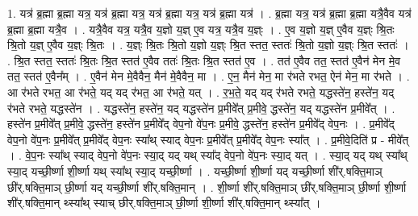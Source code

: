 \documentclass[17pt]{extarticle}
\begin{document}
1. यत्र॑ ब्र॒ह्मा ब्र॒ह्मा यत्र॒ यत्र॑ ब्र॒ह्मा यत्र॒ यत्र॑ ब्र॒ह्मा यत्र॒ यत्र॑ ब्र॒ह्मा यत्र॑ । . ब्र॒ह्मा यत्र॒ यत्र॑ ब्र॒ह्मा ब्र॒ह्मा यत्रै॒वैव यत्र॑ ब्र॒ह्मा ब्र॒ह्मा यत्रै॒व । . यत्रै॒वैव यत्र॒ यत्रै॒व य॒ज्ञो य॒ज्ञ् ए॒व यत्र॒ यत्रै॒व य॒ज्ञ्ः । . ए॒व य॒ज्ञो य॒ज्ञ् ए॒वैव य॒ज्ञ्ः श्रि॒तः श्रि॒तो य॒ज्ञ् ए॒वैव य॒ज्ञ्ः श्रि॒तः । . य॒ज्ञ्ः श्रि॒तः श्रि॒तो य॒ज्ञो य॒ज्ञ्ः श्रि॒त स्तत॒ स्ततः॑ श्रि॒तो य॒ज्ञो य॒ज्ञ्ः श्रि॒त स्ततः॑ । . श्रि॒त स्तत॒ स्ततः॑ श्रि॒तः श्रि॒त स्तत॑ ए॒वैव ततः॑ श्रि॒तः श्रि॒त स्तत॑ ए॒व । . तत॑ ए॒वैव तत॒ स्तत॑ ए॒वैन॑ मेन मे॒व तत॒ स्तत॑ ए॒वैन᳚म् । . ए॒वैन॑ मेन मे॒वैवैन॒ मैन॑ मे॒वैवैन॒ मा । . ए॒न॒ मैन॑ मेन॒ मा र॑भते रभत॒ ऐन॑ मेन॒ मा र॑भते । . आ र॑भते रभत॒ आ र॑भते॒ यद् यद् र॑भत॒ आ र॑भते॒ यत् । . र॒भ॒ते॒ यद् यद् र॑भते रभते॒ यद्धस्ते॑न॒ हस्ते॑न॒ यद् र॑भते रभते॒ यद्धस्ते॑न । . यद्धस्ते॑न॒ हस्ते॑न॒ यद् यद्धस्ते॑न प्र॒मीवे᳚त् प्र॒मीवे॒ द्धस्ते॑न॒ यद् यद्धस्ते॑न प्र॒मीवे᳚त् । . हस्ते॑न प्र॒मीवे᳚त् प्र॒मीवे॒ द्धस्ते॑न॒ हस्ते॑न प्र॒मीवे᳚द् वेप॒नो वे॑प॒नः प्र॒मीवे॒ द्धस्ते॑न॒ हस्ते॑न प्र॒मीवे᳚द् वेप॒नः । . प्र॒मीवे᳚द् वेप॒नो वे॑प॒नः प्र॒मीवे᳚त् प्र॒मीवे᳚द् वेप॒नः स्या᳚थ् स्याद् वेप॒नः प्र॒मीवे᳚त् प्र॒मीवे᳚द् वेप॒नः स्या᳚त् । . प्र॒मीवे॒दिति॑ प्र - मीवे᳚त् । . वे॒प॒नः स्या᳚थ् स्याद् वेप॒नो वे॑प॒नः स्या॒द् यद् यथ् स्या᳚द् वेप॒नो वे॑प॒नः स्या॒द् यत् । . स्या॒द् यद् यथ् स्या᳚थ् स्या॒द् यच्छी॒र्ष्णा शी॒र्ष्णा यथ् स्या᳚थ् स्या॒द् यच्छी॒र्ष्णा । . यच्छी॒र्ष्णा शी॒र्ष्णा यद् यच्छी॒र्ष्णा शी॑र्.षक्ति॒माञ् छी॑र्.षक्ति॒माञ् छी॒र्ष्णा यद् यच्छी॒र्ष्णा शी॑र्.षक्ति॒मान् । . शी॒र्ष्णा शी॑र्.षक्ति॒माञ् छी॑र्.षक्ति॒माञ् छी॒र्ष्णा शी॒र्ष्णा शी॑र्.षक्ति॒मान् थ्स्या᳚थ् स्याच् छीर्.षक्ति॒माञ् छी॒र्ष्णा शी॒र्ष्णा शी॑र्.षक्ति॒मान् थ्स्या᳚त् । \newline
\end{document}

